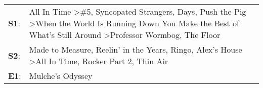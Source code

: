 \begin{supertabular}{p{0.03\textwidth}p{0.92\textwidth}}
 \textbf{S1}:  &  All In Time\textsuperscript{} \textgreater \enspace \#5\textsuperscript{}, \enspace Syncopated Strangers\textsuperscript{},  Days\textsuperscript{}, \enspace Push the Pig\textsuperscript{} \textgreater \enspace When the World Is Running Down You Make the Best of What's Still Around\textsuperscript{} \textgreater \enspace Professor Wormbog\textsuperscript{}, \enspace The Floor\textsuperscript{}  \enspace  \\
 \textbf{S2}:  &                                                                                                                         Made to Measure\textsuperscript{}, \enspace Reelin' in the Years\textsuperscript{}, \enspace Ringo\textsuperscript{}, \enspace Alex's House\textsuperscript{} \textgreater \enspace All In Time\textsuperscript{}, \enspace Rocker Part 2\textsuperscript{}, \enspace Thin Air\textsuperscript{}  \enspace  \\
 \textbf{E1}:  &                                                                                                                                                                                                                                                                                                                                                                                       Mulche's Odyssey\textsuperscript{}  \enspace  \\
\end{supertabular}
